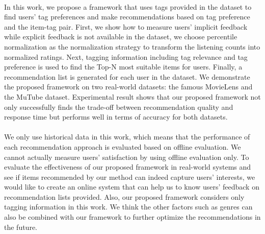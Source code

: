 \documentclass[a4paper,12pt]{report}
\begin{document}
\paragraph{}
In this work, we propose a framework that uses tags provided in the dataset to find users' tag preferences and make recommendations based on tag preference and the item-tag pair. First, we show how to measure users' implicit feedback while explicit feedback is not available in the dataset, we choose percentile normalization as the normalization strategy to transform the listening counts into normalized ratings. Next, tagging information including tag relevance and tag preference is used to find the Top-N most suitable items for users. Finally, a recommendation list is generated for each user in the dataset. We demonstrate the proposed framework on two real-world datasets: the famous MovieLens and the MuTube dataset. Experimental result shows that our proposed framework not only successfully finds the trade-off between recommendation quality and response time but performs well in terms of accuracy for both datasets.
\paragraph{}
We only use historical data in this work, which means that the performance of each recommendation approach is evaluated based on offline evaluation. We cannot actually measure users' satisfaction by using offline evaluation only. To evaluate the effectiveness of our proposed framework in real-world systems and see if items recommended by our method can indeed capture users' interests, we would like to create an online system that can help us to know users' feedback on recommendation lists provided. Also, our proposed framework considers only tagging information in this work. We think the other factors such as genres can also be combined with our framework to further optimize the recommendations in the future.
\newpage
{}


\end{document}
